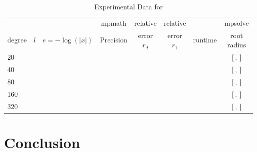 \documentclass[sigconf]{acmart}
\begin{document}
\begin{table}[t]
\caption{Experimental Data for }
\label{tab:template}
\vskip -0.15in
\begin{center}
\begin{small}
\begin{sc}
\begin{tabular}{lccccccc}
\toprule
&  &  & mpmath & relative  & relative &  & mpsolve \\
degree  & $l$& $e=-\log(|x|)$& Precision &error $r_d$       & error $r_1$ &runtime& root radius\\
\midrule
   20 &  &  &  &  &  &  & $[,]$ \\
   40 &  &  &  &  &  &  & $[,]$\\
   80 &  &  &  &  &  &  & $[,]$\\
 160 &  &  &  &  &  &  & $[,]$\\
 320 &  &  &  &  &  &  & $[,]$\\
\bottomrule
\end{tabular}
\end{sc}
\end{small}
\end{center}
\vskip 0.05in
\end{table}


\section{Conclusion}





\appendix
\end{document}
